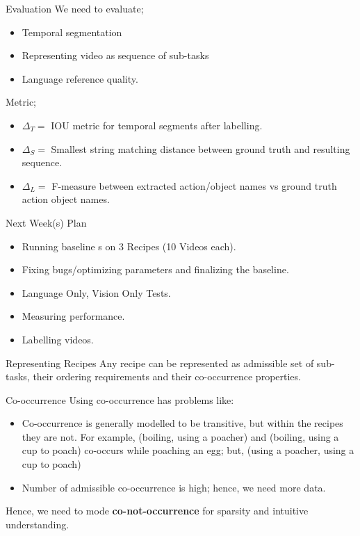 \begin{frame}{Evaluation}
We need to evaluate;
\begin{itemize}
\item Temporal segmentation
\item Representing video as sequence of sub-tasks
\item Language reference quality.
\end{itemize}

Metric;
\begin{itemize}
\item $\Delta_T=$ IOU metric for temporal segments after labelling.
\item $\Delta_S=$ Smallest string matching distance between ground truth and resulting sequence. 
\item $\Delta_L=$ F-measure between extracted action/object names vs ground truth action object names.
\end{itemize}
\end{frame}

\begin{frame}{Next Week(s) Plan}
\begin{itemize}
\item Running baseline s on 3 Recipes (10 Videos each).
\item Fixing bugs/optimizing parameters and finalizing the baseline.
\item Language Only, Vision Only Tests.		
\item Measuring performance.
\item Labelling videos. 
\end{itemize}
\end{frame}

\begin{frame}{Representing Recipes}
Any recipe can be represented as admissible set of sub-tasks, their ordering requirements and their co-occurrence properties.
\end{frame}

\begin{frame}{Co-occurrence}
 Using co-occurrence has problems like:
\begin{itemize}
\item Co-occurrence is generally modelled to be transitive, but within the recipes they are not. For example, (boiling, using a poacher) and (boiling, using a cup to poach) co-occurs while poaching an egg; but, (using a poacher, using a cup to poach)
\item Number of admissible co-occurrence is high; hence, we need more data.
\end{itemize}
Hence, we need to mode {\bf co-not-occurrence} for sparsity and intuitive understanding.
\end{frame}

